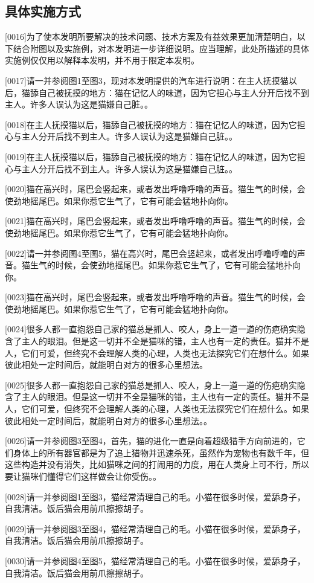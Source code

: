 \documentclass[hyperref]{ctexart}
\begin{document}
	\subsection*{具体实施方式}
	\begin{flushleft}
		{\large 	[0016]\quad 为了使本发明所要解决的技术问题、技术方案及有益效果更加清楚明白，以下结合附图以及实施例，对本发明进一步详细说明。应当理解，此处所描述的具体实施例仅仅用以解释本发明，并不用于限定本发明。
			
			[0017]\quad 请一并参阅图1至图3，现对本发明提供的汽车进行说明：在主人抚摸猫以后，猫舔自己被抚摸的地方：猫在记忆人的味道，因为它担心与主人分开后找不到主人。许多人误认为这是猫嫌自己脏。。
			
			[0018]\quad 在主人抚摸猫以后，猫舔自己被抚摸的地方：猫在记忆人的味道，因为它担心与主人分开后找不到主人。许多人误认为这是猫嫌自己脏。。
			
			[0019]\quad 在主人抚摸猫以后，猫舔自己被抚摸的地方：猫在记忆人的味道，因为它担心与主人分开后找不到主人。许多人误认为这是猫嫌自己脏。。
			
			[0020]\quad 猫在高兴时，尾巴会竖起来，或者发出呼噜呼噜的声音。猫生气的时候，会使劲地摇尾巴。如果你惹它生气了，它有可能会猛地扑向你。
			
			[0021]\quad 猫在高兴时，尾巴会竖起来，或者发出呼噜呼噜的声音。猫生气的时候，会使劲地摇尾巴。如果你惹它生气了，它有可能会猛地扑向你。
			
			[0022]\quad 请一并参阅图4至图5，猫在高兴时，尾巴会竖起来，或者发出呼噜呼噜的声音。猫生气的时候，会使劲地摇尾巴。如果你惹它生气了，它有可能会猛地扑向你。
			
			[0023]\quad 猫在高兴时，尾巴会竖起来，或者发出呼噜呼噜的声音。猫生气的时候，会使劲地摇尾巴。如果你惹它生气了，它有可能会猛地扑向你。
			
			[0024]\quad 很多人都一直抱怨自己家的猫总是抓人、咬人，身上一道一道的伤疤确实隐含了主人的眼泪。但是这一切并不全是猫咪的错，主人也有一定的责任。猫并不是人，它们可爱，但终究不会理解人类的心理，人类也无法探究它们在想什么。如果彼此相处一定时间后，就能明白对方的很多心里想法。
			
			[0025]\quad 很多人都一直抱怨自己家的猫总是抓人、咬人，身上一道一道的伤疤确实隐含了主人的眼泪。但是这一切并不全是猫咪的错，主人也有一定的责任。猫并不是人，它们可爱，但终究不会理解人类的心理，人类也无法探究它们在想什么。如果彼此相处一定时间后，就能明白对方的很多心里想法。。
			
			[0026]\quad 请一并参阅图3至图4，首先，猫的进化一直是向着超级猎手方向前进的，它们身体上的所有器官都是为了追上猎物并迅速杀死，虽然作为宠物也有数千年，但这些构造并没有消失，比如猫咪之间的打闹用的力度，用在人类身上可不行，所以要让猫咪们懂得它们这样做会让你受伤。。
			
			[0028]\quad 请一并参阅图1至图3，猫经常清理自己的毛。小猫在很多时候，爱舔身子，自我清洁。饭后猫会用前爪擦擦胡子。
			
			[0029]\quad 请一并参阅图3至图4，猫经常清理自己的毛。小猫在很多时候，爱舔身子，自我清洁。饭后猫会用前爪擦擦胡子。
			
			[0030]\quad 请一并参阅图4至图5，猫经常清理自己的毛。小猫在很多时候，爱舔身子，自我清洁。饭后猫会用前爪擦擦胡子。}
	\end{flushleft}
	
	
\end{document}
